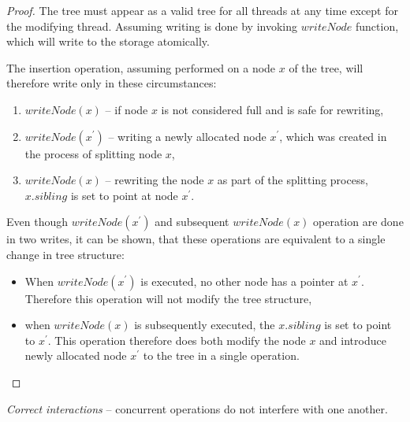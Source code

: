 \begin{proof}
  The tree must appear as a valid tree for all threads at any time except for the modifying thread. Assuming writing is done by invoking $writeNode$ function, which will write to the storage atomically.

  The insertion operation, assuming performed on a node $x$ of the tree, will therefore write only in these circumstances:

  \begin{enumerate}
    \item $writeNode(x)$ -- if node $x$ is not considered full and is safe for rewriting,
    \item $writeNode(x^\prime)$ -- writing a newly allocated node $x^\prime$, which was created in the process of splitting node $x$,
    \item $writeNode(x)$ -- rewriting the node $x$ as part of the splitting process, $x.sibling$ is set to point at node $x^\prime$.
  \end{enumerate}

  Even though $writeNode(x^\prime)$ and subsequent $writeNode(x)$ operation are done in two writes, it can be shown, that these operations are equivalent to a single change in tree structure:

  \begin{itemize}
    \item When $writeNode(x^\prime)$ is executed, no other node has a pointer at $x^\prime$. Therefore this operation will not modify the tree structure,
    \item when $writeNode(x)$ is subsequently executed, the $x.sibling$ is set to point to $x^\prime$. This operation therefore does both modify the node $x$ and introduce newly allocated node $x^\prime$ to the tree in a single operation.
  \end{itemize}
\end{proof}

\begin{theorem}
  \textit{Correct interactions} -- concurrent operations do not interfere with one another.
\end{theorem}

